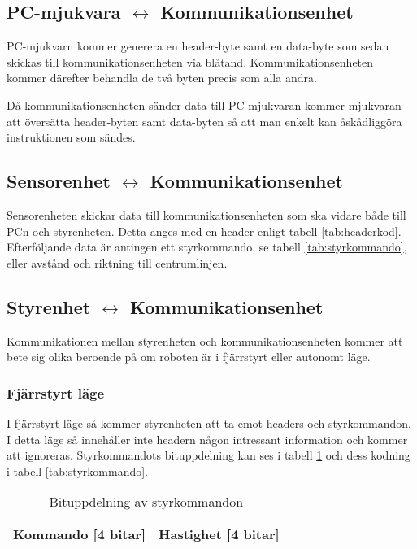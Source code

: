 \subsection{PC-mjukvara $\longleftrightarrow$ Kommunikationsenhet}
PC-mjukvarn kommer generera en header-byte samt en data-byte som sedan skickas
till kommunikationsenheten via blåtand. Kommunikationsenheten kommer därefter
behandla de två byten precis som alla andra.

Då kommunikationsenheten sänder data till PC-mjukvaran kommer mjukvaran att
översätta header-byten samt data-byten så att man enkelt kan åskådliggöra
instruktionen som sändes.

\subsection{Sensorenhet $\longleftrightarrow$ Kommunikationsenhet}
Sensorenheten skickar data till kommunikationsenheten som ska vidare både till PCn och styrenheten. Detta anges med en header enligt tabell \ref{tab:headerkod}. Efterföljande data är antingen ett styrkommando, se tabell \ref{tab:styrkommando}, eller avstånd och riktning till centrumlinjen.

\subsection{Styrenhet $\longleftrightarrow$ Kommunikationsenhet}
Kommunikationen mellan styrenheten och kommunikationsenheten kommer att bete sig olika beroende på
om roboten är i fjärrstyrt eller autonomt läge.
\subsubsection{Fjärrstyrt läge}
I fjärrstyrt läge så kommer styrenheten att ta emot headers och styrkommandon. I detta läge så 
innehåller inte headern någon intressant information och kommer att ignoreras. Styrkommandots bituppdelning kan ses i 
tabell \ref{tab:styrbitar} och dess kodning i tabell \ref{tab:styrkommando}.
 
\begin{table}[h] 
  \centering
  \begin{tabular}{| c | c |}
    \hline
    Kommando [4 bitar] & Hastighet [4 bitar] \\ \hline
  \end{tabular}
  \caption{Bituppdelning av styrkommandon}
  \label{tab:styrbitar}
\end{table}

